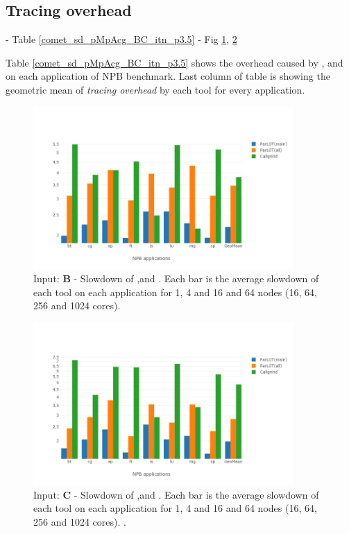 

\subsection{Tracing overhead}
\label{subsec:lowtoh}
 - Table \ref{comet_sd_pMpAcg_BC_itn_p3.5}
 - Fig \ref{comet_chartAvg_sd_B_p3_5}, \ref{comet_chartAvg_sd_C_p3_5} 
 

   
Table \ref{comet_sd_pMpAcg_BC_itn_p3.5} shows the overhead caused by \parlotm, \parlota and  \callgrind on each application of NPB benchmark.
 Last column of table is showing the geometric mean of \textit{tracing overhead} by each tool for every application. \\
 

\begin{figure}[!t]
\centering
\includegraphics[width=3.9in]{figs.comet/comet_chartAvg_sd_B_p3_5.png}
\caption{ Input: \textbf{B} - Slowdown of \parlotm ,\parlota and \callgrind. Each bar is the average slowdown of each tool on each application for 1, 4 and 16 and 64 nodes (16, 64, 256 and 1024 cores). 
}
\label{comet_chartAvg_sd_B_p3_5}
\end{figure}


\begin{figure}[!t]
\centering
\includegraphics[width=3.9in]{figs.comet/comet_chartAvg_sd_C_p3_5.png}
\caption{ Input: \textbf{C} - Slowdown of \parlotm ,\parlota and \callgrind. Each bar is the average slowdown of each tool on each application for 1, 4 and 16 and 64 nodes (16, 64, 256 and 1024 cores). . 
}
\label{comet_chartAvg_sd_C_p3_5}
\end{figure}


